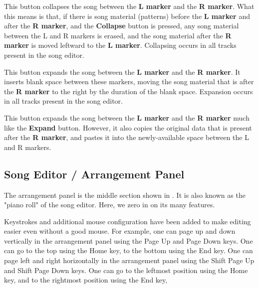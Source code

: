    This button collapses the song between the \textbf{L marker} and the
   \textbf{R marker}.
   What this means is that, if there is song material (patterns) before the
   \textbf{L marker} and after the \textbf{R marker},
   and the \textbf{Collapse} button is
   pressed, any song material between the L and R markers is erased, and
   the song material after the \textbf{R marker} is moved leftward to
   the \textbf{L marker}.
   Collapsing occurs in all tracks present in the song editor.

   This button expands the song between the
   \textbf{L marker} and the \textbf{R marker}.
   It inserts blank space between these markers, moving the song material
   that is after the \textbf{R marker}
   to the right by the duration of the blank space.
   Expansion occurs in all tracks present in the song editor.

   This button expands the song between the \textbf{L marker} and the
   \textbf{R marker} much like the \textbf{Expand} button.
   However, it also copies the original data that is present after the
   \textbf{R marker}, and pastes it into the newly-available space between
   the L and R markers.

\subsection{Song Editor / Arrangement Panel}
\label{subsec:seq64_song_editor_arrangement_panel}

   The arrangement panel is the middle section shown in
   .  It is also known as the
   "piano roll" of the song editor. Here, we zero in on its many
   features.

   Keystrokes and additional mouse configuration have been added to make
   editing easier even without a good mouse.
   For example, one can page up and down vertically in the arrangement
   panel using the
    Page Up and 
    Page Down keys.
   One can go to the top using the 
    Home key,
   to the bottom using the
    End key.
   One can page left and right horizontally in the arrangement
   panel using the
    Shift Page Up and 
    Shift Page Down keys.
   One can go to the leftmost position using the 
    Home key,
   and to the rightmost position using the
    End key,

